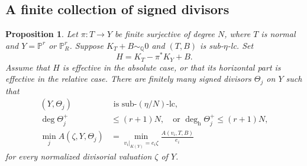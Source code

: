 \documentclass[11pt,reqno]{amsart}
\numberwithin{equation}{section}
\newtheorem{proposition}[theorem]{Proposition}
\theoremstyle{definition}
\theoremstyle{remark}
\newcommand{\Q}{\mathbb Q}
\newcommand{\PP}{\mathbb P}
\newcommand{\simq}{\sim_{\Q}}
\newcommand{\degh}{\deg_{\mathrm h}}
\begin{document}
\subsection{A finite collection of signed divisors}
\begin{proposition}\label{prop:transfer}
Let $\pi:T\to Y$ be finite surjective of degree $N$, where $T$ is normal and $Y=\PP^r$ or $\PP^r_R$. Suppose $K_T+B\simq0$ and $(T,B)$ is sub-$\eta$-lc. Set
\[
 H=K_T-\pi^*K_Y+B.
\]
Assume that $H$ is effective in the absolute case, or that its horizontal part is effective in the relative case. There are finitely many signed divisors $\Theta_j$ on $Y$ such that
\begin{align}
 (Y,\Theta_j)&\text{ is sub-}(\eta/N)\text{-lc},\label{eq:trans1}\\
 \deg\Theta_j^+&\le(r+1)N,
 \quad\text{or }\degh\Theta_j^+\le(r+1)N,\label{eq:trans2}\\
 \min_j A(\zeta,Y,\Theta_j)
 &=\min_{v_i|_{K(Y)}=e_i\zeta}
 \frac{A(v_i,T,B)}{e_i}\label{eq:trans3}
\end{align}
for every normalized divisorial valuation $\zeta$ of $Y$.
\end{proposition}
\end{document}
